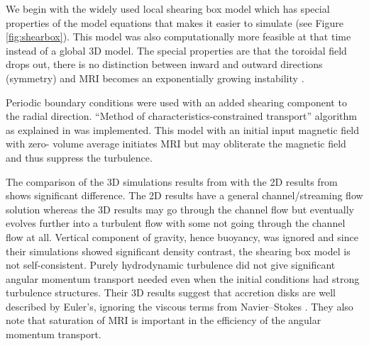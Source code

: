 \documentclass{jfm}
\begin{document}
We begin with the widely used local shearing box model \citep{Balbus1991} which
has special properties of the model equations that makes it easier to simulate
(see Figure \ref{fig:shearbox}). This model was also computationally more
feasible at that time instead of a global 3D model. The special properties are
that the toroidal field drops out, there is no distinction between inward and
outward directions (symmetry) and MRI becomes an exponentially growing
instability \citep{Julien2010}.

Periodic boundary conditions were used with an added shearing component to the
radial direction. ``Method of characteristics-constrained transport'' algorithm
as explained in \cite{Hawley1995} was implemented. This model with an initial
input magnetic field with zero- volume average initiates MRI but may obliterate
the magnetic field and thus suppress the turbulence.

The comparison of the 3D simulations results from \cite{Hawley1995} with the 2D
results from \cite{Balbus1994} shows significant difference. The 2D results
have a general channel/streaming flow solution whereas the 3D results may go
through the channel flow but eventually evolves further into a turbulent flow
with some not going through the channel flow at all. Vertical component of
gravity, hence buoyancy, was ignored and since their simulations showed
significant density contrast, the shearing box model is not self-consistent.
Purely hydrodynamic turbulence did not give significant angular momentum
transport needed even when the initial conditions had strong turbulence
structures. Their 3D results suggest that accretion disks are well described by
Euler's, ignoring the viscous terms from Navier--Stokes \citep{Hawley1995}.
They also note that saturation of MRI is important in the efficiency of the
angular momentum transport.
\end{document}
